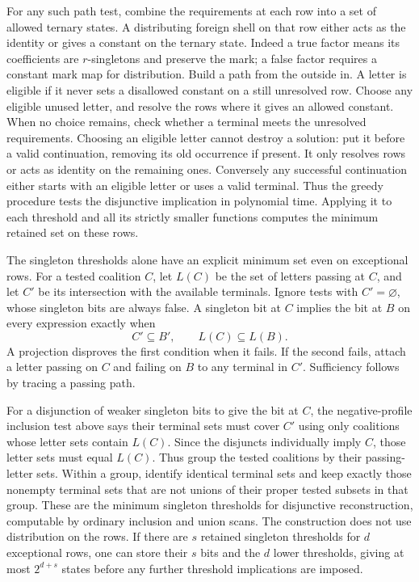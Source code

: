 For any such path test, combine the requirements
at each row into a set of allowed ternary states.
A distributing foreign shell on that row either
acts as the identity or gives a constant on the
ternary state. Indeed a true factor means its
coefficients are $r$-singletons and preserve the
mark; a false factor requires a constant mark map
for distribution. Build a path from the outside
in. A letter is eligible if it never sets a
disallowed constant on a still unresolved row.
Choose any eligible unused letter, and resolve
the rows where it gives an allowed constant.
When no choice remains, check whether a terminal
meets the unresolved requirements. Choosing an
eligible letter cannot destroy a solution: put it
before a valid continuation, removing its old
occurrence if present. It only resolves rows or
acts as identity on the remaining ones. Conversely
any successful continuation either starts with an
eligible letter or uses a valid terminal. Thus the
greedy procedure tests the disjunctive implication
in polynomial time. Applying it to each threshold
and all its strictly smaller functions computes the
minimum retained set on these rows.

The singleton thresholds alone have an explicit
minimum set even on exceptional rows. For a tested
coalition $C$, let $L(C)$ be the set of letters
passing at $C$, and let $C'$ be its intersection
with the available terminals. Ignore tests with
$C'=\varnothing$, whose singleton bits are always
false. A singleton bit at $C$ implies the bit at
$B$ on every expression exactly when
\[
                   C'\subseteq B',\qquad L(C)\subseteq L(B).
\]
A projection disproves the first condition when
it fails. If the second fails, attach a letter
passing on $C$ and failing on $B$ to any terminal
in $C'$. Sufficiency follows by tracing a passing
path.

For a disjunction of weaker singleton bits to give
the bit at $C$, the negative-profile inclusion test
above says their terminal sets must cover $C'$ using
only coalitions whose letter sets contain $L(C)$.
Since the disjuncts individually imply $C$, those
letter sets must equal $L(C)$. Thus group the tested
coalitions by their passing-letter sets. Within a
group, identify identical terminal sets and keep
exactly those nonempty terminal sets that are not
unions of their proper tested subsets in that group.
These are the minimum singleton thresholds for
disjunctive reconstruction, computable by ordinary
inclusion and union scans. The construction does
not use distribution on the rows. If there are
$s$ retained singleton thresholds for $d$ exceptional
rows, one can store their $s$ bits and the $d$ lower
thresholds, giving at most $2^{d+s}$ states before
any further threshold implications are imposed.


